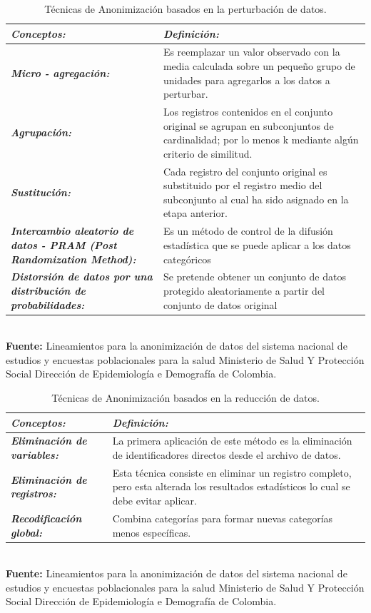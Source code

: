\documentclass[a4paper,openright,12pt]{book}
\theoremstyle{definition}
\theoremstyle{remark}
\begin{document}
\begin{table}[ht]
\centering
\caption{Técnicas de Anonimización basados en la perturbación de datos.}
\begin{tabular}{>{\centering\arraybackslash}m{3cm} >{\arraybackslash}m{10cm} }
\hline
\textbf{\textit{Conceptos:}} & \textbf{\textit{Definición:}} \\ \hline
\textbf{\textit{Micro - agregación:}} & Es reemplazar un valor observado con la media calculada sobre un pequeño grupo de unidades para agregarlos a los datos a perturbar. \\ \hline
\textbf{\textit{Agrupación:}} & Los registros contenidos en el conjunto original se agrupan en subconjuntos de cardinalidad; por lo menos k mediante algún criterio de similitud.\\ \hline
\textbf{\textit{Sustitución:}} & Cada registro del conjunto original es substituido por el registro medio del subconjunto al cual ha sido asignado en la etapa anterior. \\ \hline
\textbf{\textit{Intercambio aleatorio de datos - PRAM (Post Randomization Method):}} & Es un método de control de la difusión estadística que se puede aplicar a los datos categóricos \\ \hline
\textbf{\textit{Distorsión de datos por una distribución de probabilidades:}} & Se pretende obtener un conjunto de datos protegido aleatoriamente a partir del conjunto de datos original \\ \hline
\end{tabular}
\label{tabla:RobustezPropiedades}
\\\textbf{Fuente:} Lineamientos para la anonimización de datos del sistema nacional de estudios y encuestas poblacionales para la salud Ministerio de Salud Y Protección Social Dirección de Epidemiología e Demografía de Colombia.
\end{table}

\begin{table}[htbp]
\centering
\caption{Técnicas de Anonimización basados en la reducción de datos.}
\begin{tabular}{>{\centering\arraybackslash}m{3cm} >{\arraybackslash}m{10cm} }
\hline
\textbf{\textit{Conceptos:}} & \textbf{\textit{Definición:}} \\ \hline
\textbf{\textit{Eliminación de variables:}} & La primera aplicación de este método es la eliminación de identificadores directos desde el archivo de datos. \\ \hline
\textbf{\textit{Eliminación de registros:}} & Esta técnica consiste en eliminar un registro completo, pero esta alterada los resultados estadísticos lo cual se debe evitar aplicar.  \\ \hline
\textbf{\textit{Recodificación global:}} & Combina categorías para formar nuevas categorías menos específicas. \\ \hline
\end{tabular}
\label{tabla:RobustezPropiedades}
\\\textbf{Fuente:} Lineamientos para la anonimización de datos del sistema nacional de estudios y encuestas poblacionales para la salud Ministerio de Salud Y Protección Social Dirección de Epidemiología e Demografía de Colombia.
\end{table}
\end{document}
